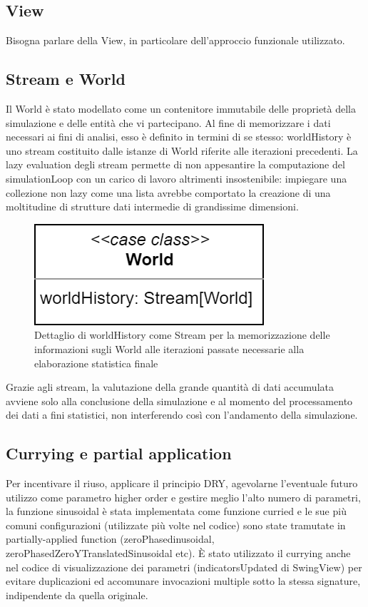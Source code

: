 \subsection{View}
Bisogna parlare della View, in particolare dell'approccio funzionale utilizzato.


\subsection{Stream e World}
Il World è stato modellato come un contenitore immutabile delle proprietà della simulazione e delle entità che vi partecipano. Al fine di memorizzare i dati necessari ai fini di analisi, esso è definito in termini di se stesso: worldHistory è uno stream costituito dalle istanze di World riferite alle iterazioni precedenti. La lazy evaluation degli stream permette di non appesantire la computazione del simulationLoop con un carico di lavoro altrimenti insostenibile: impiegare una collezione non lazy come una lista avrebbe comportato la creazione di una moltitudine di strutture dati intermedie di grandissime dimensioni. 

\begin{figure}[h!]
\centering
\includegraphics[scale=0.30]{img/WorldDetail.png}
\caption{Dettaglio di worldHistory come Stream per la memorizzazione delle informazioni sugli World alle iterazioni passate necessarie alla elaborazione statistica finale}
\label{fig:worldDetail}
\end{figure}

Grazie agli stream, la valutazione della grande quantità di dati accumulata avviene solo alla conclusione della simulazione e al momento del processamento dei dati a fini statistici, non interferendo così con l’andamento della simulazione.

\subsection{Currying e partial application}
Per incentivare il riuso, applicare il principio DRY, agevolarne l’eventuale futuro utilizzo come parametro higher order e gestire meglio l’alto numero di parametri, la funzione sinusoidal è stata implementata come funzione curried e le sue più comuni configurazioni (utilizzate più volte nel codice) sono state tramutate in partially-applied function (zeroPhasedinusoidal, zeroPhasedZeroYTranslatedSinusoidal etc). È stato utilizzato il currying anche nel codice di visualizzazione dei parametri (indicatorsUpdated di SwingView) per evitare duplicazioni ed accomunare invocazioni multiple sotto la stessa signature, indipendente da quella originale.

